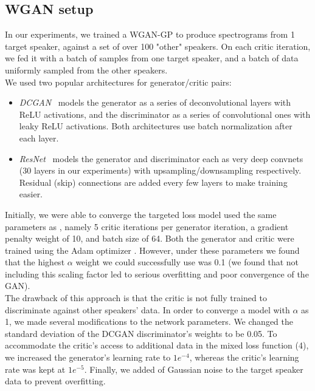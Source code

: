 \subsection{WGAN setup}
In our experiments, we trained a WGAN-GP
to produce spectrograms from 1 target speaker, against a set of over 100 "other" speakers. On each critic
iteration, we fed it with a batch of samples from one target speaker, 
and a batch of data uniformly sampled from the other speakers. \\ We used two popular
architectures for generator/critic pairs: 
\begin{itemize}
    \item \textit{DCGAN}~\cite{radford2015unsupervised} models the generator as a series of deconvolutional layers with ReLU activations, and the discriminator as a series of convolutional ones with leaky ReLU activations. Both architectures use batch normalization after each layer.
    \item \textit{ResNet}~\cite{ledig2016photo} models the generator and discriminator each as very deep convnets (30 layers in our experiments) with upsampling/downsampling respectively. Residual (skip) connections are added every few layers to make training easier.
\end{itemize}
Initially, we were able to converge the targeted loss model used the same parameters as \cite{gulrajani2017improved}, namely 5 critic iterations per generator iteration, a gradient penalty weight of 10, and batch size of 64. Both the generator and critic were trained using the Adam optimizer \cite{kingma2014adam}. However, under these parameters we found that the highest $\alpha$ weight we could successfully use was 0.1 (we found that not including this scaling factor led to serious overfitting and poor convergence of the GAN). \\ The drawback of this approach is that the critic is not fully trained to discriminate against other speakers' data. In order to converge a model with $\alpha$ as 1, we made several modifications to 
the network parameters. We changed the standard deviation of the DCGAN discriminator's weights to be 0.05. To accommodate the critic's access to additional data in the mixed loss function (4), we increased the generator's learning rate to $1e^{-4}$, whereas the critic's learning rate was kept at $1e^{-5}$. Finally, we added of Gaussian noise to the target speaker data to prevent overfitting. 


